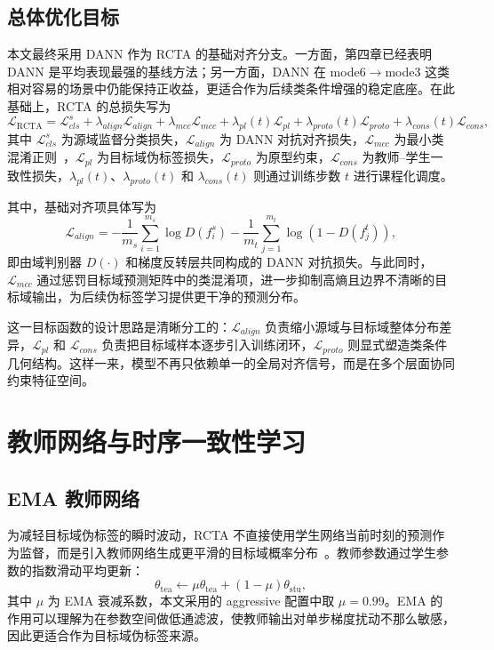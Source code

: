 \subsection{总体优化目标}
本文最终采用 DANN 作为 RCTA 的基础对齐分支。一方面，第四章已经表明 DANN 是平均表现最强的基线方法；另一方面，DANN 在 mode6$\rightarrow$mode3 这类相对容易的场景中仍能保持正收益，更适合作为后续类条件增强的稳定底座。在此基础上，RCTA 的总损失写为
\begin{equation}
\mathcal{L}_{\mathrm{RCTA}}=
\mathcal{L}_{cls}^s
+\lambda_{align}\mathcal{L}_{align}
+\lambda_{mcc}\mathcal{L}_{mcc}
+\lambda_{pl}(t)\mathcal{L}_{pl}
+\lambda_{proto}(t)\mathcal{L}_{proto}
+\lambda_{cons}(t)\mathcal{L}_{cons},
\end{equation}
其中 $\mathcal{L}_{cls}^s$ 为源域监督分类损失，$\mathcal{L}_{align}$ 为 DANN 对抗对齐损失，$\mathcal{L}_{mcc}$ 为最小类混淆正则~\cite{jin2020mcc}，$\mathcal{L}_{pl}$ 为目标域伪标签损失，$\mathcal{L}_{proto}$ 为原型约束，$\mathcal{L}_{cons}$ 为教师--学生一致性损失，$\lambda_{pl}(t)$、$\lambda_{proto}(t)$ 和 $\lambda_{cons}(t)$ 则通过训练步数 $t$ 进行课程化调度。

其中，基础对齐项具体写为
\begin{equation}
\mathcal{L}_{align}=
-\frac{1}{m_s}\sum_{i=1}^{m_s}\log D(f_i^s)
-\frac{1}{m_t}\sum_{j=1}^{m_t}\log(1-D(f_j^t)),
\end{equation}
即由域判别器 $D(\cdot)$ 和梯度反转层共同构成的 DANN 对抗损失。与此同时，$\mathcal{L}_{mcc}$ 通过惩罚目标域预测矩阵中的类混淆项，进一步抑制高熵且边界不清晰的目标域输出，为后续伪标签学习提供更干净的预测分布。

这一目标函数的设计思路是清晰分工的：$\mathcal{L}_{align}$ 负责缩小源域与目标域整体分布差异，$\mathcal{L}_{pl}$ 和 $\mathcal{L}_{cons}$ 负责把目标域样本逐步引入训练闭环，$\mathcal{L}_{proto}$ 则显式塑造类条件几何结构。这样一来，模型不再只依赖单一的全局对齐信号，而是在多个层面协同约束特征空间。

\section{教师网络与时序一致性学习}
\subsection{EMA 教师网络}
为减轻目标域伪标签的瞬时波动，RCTA 不直接使用学生网络当前时刻的预测作为监督，而是引入教师网络生成更平滑的目标域概率分布~\cite{tarvainen2017meanteacher}。教师参数通过学生参数的指数滑动平均更新：
\begin{equation}
\theta_{\mathrm{tea}}\leftarrow
\mu \theta_{\mathrm{tea}}+(1-\mu)\theta_{\mathrm{stu}},
\end{equation}
其中 $\mu$ 为 EMA 衰减系数，本文采用的 aggressive 配置中取 $\mu=0.99$。EMA 的作用可以理解为在参数空间做低通滤波，使教师输出对单步梯度扰动不那么敏感，因此更适合作为目标域伪标签来源。

